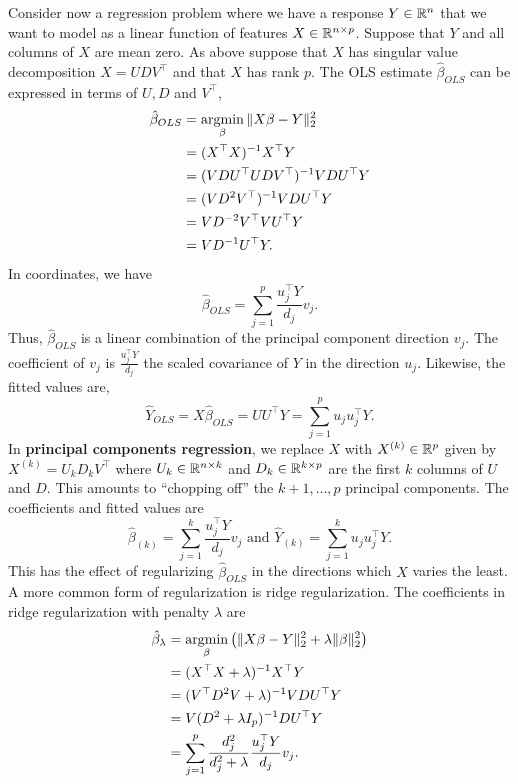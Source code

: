 Consider now a regression problem where we have a response $Y \in \mathbb{R}^n$ that we want to model as a linear function of features $X \in \mathbb{R}^{n \times p}$. Suppose that $Y$ and all columns of $X$ are mean zero. As above suppose that $X$ has singular value decomposition $X=UDV^\top$ and that $X$ has rank $p$. The OLS estimate $\hat{\beta}_{OLS}$ can be expressed in terms of $U,D$ and $V^\top$,
\begin{align*}
    \hat{\beta}_{OLS}&=\operatorname*{argmin}_{\beta} \Vert X\beta - Y \Vert_2^2 \\
    &=(X^\top X)^{-1}X^\top Y\\
    &=(VDU^\top U D V^\top)^{-1}V DU^\top Y\\
    &=(VD^2 V^\top)^{-1} VDU^\top Y\\
    &=VD^{-2}V^\top VU^\top Y\\
    &=VD^{-1}U^\top Y.
\end{align*}
In coordinates, we have
\[\hat{\beta}_{OLS} = \sum_{j=1}^p \frac{u_j^\top Y}{d_j}v_j. \]
Thus, $\hat{\beta}_{OLS}$ is a linear combination of the principal component direction $v_j$. The coefficient of $v_j$ is $\frac{u_j^\top Y}{d_j}$ the scaled covariance of $Y$ in the direction $u_j$. Likewise, the fitted values are,
\[\widehat{Y}_{OLS} = X\hat{\beta}_{OLS} = UU^\top Y =  \sum_{j=1}^p u_ju_j^\top Y. \]
In \textbf{principal components regression}, we replace $X$ with $X^{(k)} \in \mathbb{R}^p$ given by $X^{(k)}= U_k D_k V^\top$ where $U_k \in \mathbb{R}^{n \times k}$ and $D_k \in \mathbb{R}^{k \times p}$ are the first $k$ columns of $U$ and $D$. This amounts to ``chopping off'' the $k+1,\ldots,p$ principal components. The coefficients and fitted values are 
\[\hat{\beta}_{(k)} = \sum_{j=1}^k \frac{u_j^\top Y}{d_j} v_j \text{ and } \hat{Y}_{(k)} = \sum_{j=1}^k u_ju_j^\top Y. \]
This has the effect of regularizing $\hat{\beta}_{OLS}$ in the directions which $X$ varies the least. A more common form of regularization is ridge regularization. The coefficients in ridge regularization with penalty $\lambda$ are
\begin{align*}
    \hat{\beta}_\lambda&=\operatorname*{argmin}_\beta \left(\Vert X \beta - Y \Vert_2^2 + \lambda \Vert \beta\Vert_2^2 \right)\\
    &=(X^\top X + \lambda)^{-1}X^\top Y\\
    &=(V^\top D^2 V + \lambda)^{-1}VDU^\top Y\\
    &=V(D^2+\lambda I_p)^{-1}DU^\top Y\\
    &=\sum_{j=1}^p \frac{d_j^2}{d_j^2+\lambda} \frac{u_j^\top Y}{d_j}v_j.
\end{align*}
